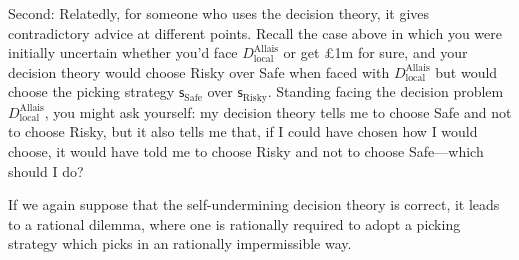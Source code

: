 \documentclass[a4paper]{article}
\newcommand\s{\mathsf{s}}
\newenvironment{CCM rewritten}
{\begingroup\color{blue}} %
{\endgroup}              %
\begin{document}


Second: Relatedly, for someone who uses the decision theory, it gives contradictory advice at different points. Recall the case above in which you were initially uncertain whether you'd face $D^\mathrm{Allais}_\mathrm{local}$ or get \pounds 1m for sure, and your decision theory would choose Risky over Safe when faced with $D^\mathrm{Allais}_\mathrm{local}$ but would choose the picking strategy $\s_\mathrm{Safe}$ over $\s_\mathrm{Risky}$. Standing facing the decision problem $D^\mathrm{Allais}_\mathrm{local}$, you might ask yourself: my decision theory tells me to choose Safe and not to choose Risky, but it also tells me that, if I could have chosen how I would choose, it would have told me to choose Risky and not to choose Safe---which should I do?

If we again suppose that the self-undermining decision theory is correct, it leads to a rational dilemma, where one is rationally required to adopt a picking strategy which picks in an rationally impermissible way. 
\end{document}
